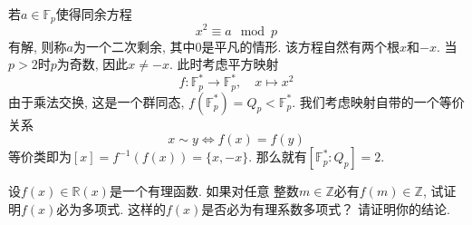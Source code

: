 \begin{remark}
    若$a \in \mathbb{F}_p$使得同余方程
    \[
        x^2 \equiv a \mod p
    \]
    有解, 则称$a$为一个二次剩余, 其中$0$是平凡的情形. 该方程自然有两个根$x$和$-x$. 当$p > 2$时$p$为奇数, 因此$x \neq -x$. 此时考虑平方映射
    \[
        f: \mathbb{F}_p^* \to \mathbb{F}_p^*,\quad x \mapsto x^2
    \]
    由于乘法交换, 这是一个群同态, $f(\mathbb{F}_p^*) = Q_p < \mathbb{F}_p^*$. 我们考虑映射自带的一个等价关系
    \[
        x \sim y \iff f(x) = f(y)
    \]
    等价类即为$[x] = f^{-1}(f(x)) = \{x, -x\}$. 那么就有$[\mathbb{F}_p^*:Q_p] = 2$.
\end{remark}

\begin{problem}
    设$f(x) \in \mathbb{R}(x)$是一个有理函数. 如果对任意
整数$m \in \mathbb{Z}$必有$f(m) \in \mathbb{Z}$,
试证明$f(x)$必为多项式. 这样的$f(x)$是否必为有理系数多项式？
请证明你的结论.
\end{problem}

